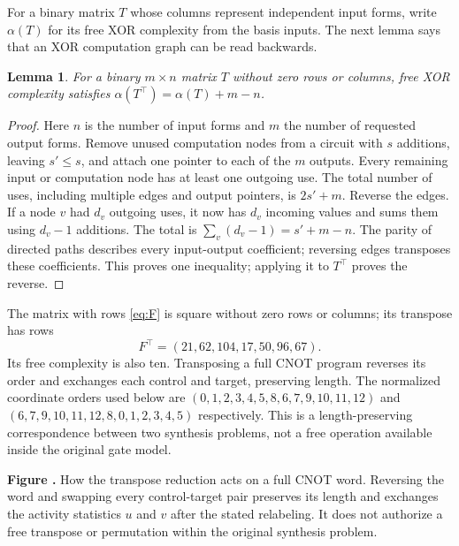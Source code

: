 \documentclass[11pt]{article}
\newtheorem{lemma}[theorem]{Lemma}
\newcommand{\prooffigure}[3]{%
  \begin{center}
  \begin{minipage}{.98\linewidth}
  \centering
  \resizebox{\linewidth}{!}{}\par
  \refstepcounter{figure}\label{#2}%
  \small\textbf{Figure \thefigure.} #3
  \end{minipage}
  \end{center}}
\begin{document}
For a binary matrix $T$ whose columns represent independent input forms,
write $\alpha(T)$ for its free XOR complexity from the basis inputs. The next
lemma says that an XOR computation graph can be read backwards.
\begin{lemma}\label{lem:transpose}
For a binary $m\times n$ matrix $T$ without zero rows or columns,
free XOR complexity satisfies $\alpha(T^\top)=\alpha(T)+m-n$.
\end{lemma}
\begin{proof}
Here $n$ is the number of input forms and $m$ the number of requested output
forms. Remove unused computation nodes from a circuit with $s$ additions,
leaving $s'\le s$, and attach one pointer to each of the $m$ outputs. Every
remaining input
or computation node has at least one outgoing use. The total number of
uses, including multiple edges and output pointers, is $2s'+m$.
Reverse the edges. If a node $v$ had $d_v$ outgoing uses, it now has $d_v$
incoming values and sums them using $d_v-1$ additions. The total is
$\sum_v(d_v-1)=s'+m-n$. The parity of directed paths describes every
input-output coefficient; reversing edges transposes these coefficients.
This proves one inequality; applying it to $T^\top$ proves the reverse.
\end{proof}
The matrix with rows \eqref{eq:F} is square without zero rows or columns;
its transpose has rows
\begin{equation}\label{eq:FT}F^\top=(21,62,104,17,50,96,67).\end{equation}
Its free complexity is also ten. Transposing a full CNOT program reverses
its order and exchanges each control and target, preserving length.
The normalized coordinate orders used below are
$(0,1,2,3,4,5,8,6,7,9,10,11,12)$ and
$(6,7,9,10,11,12,8,0,1,2,3,4,5)$ respectively.
This is a length-preserving correspondence between two synthesis problems,
not a free operation available inside the original gate model.
\prooffigure{transpose_correspondence}{fig:transpose-correspondence}{How the
transpose reduction acts on a full CNOT word. Reversing the word and swapping
every control-target pair preserves its length and exchanges the activity
statistics $u$ and $v$ after the stated relabeling. It does not authorize a
free transpose or permutation within the original synthesis problem.}
\end{document}
